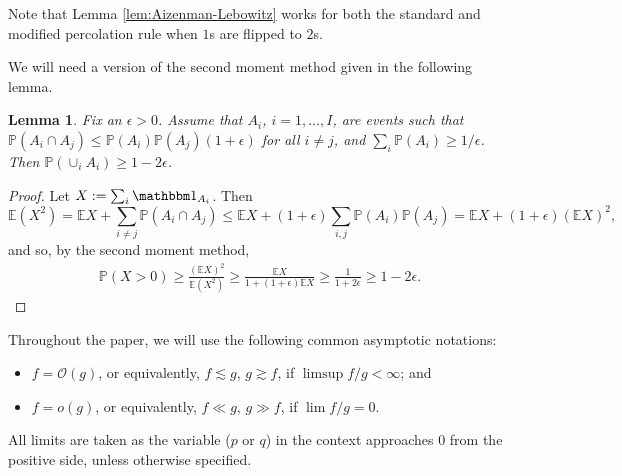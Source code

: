 \documentclass{article}
\renewcommand{\P}{\mathbb{P}}
\newcommand{\E}[0]{\mathbb{E}}
\newcommand{\cO}{\mathcal O}
\numberwithin{equation}{section}
\newtheorem{lemma}[theorem]{Lemma}
\newtheorem{remark}[theorem]{Remark}
\begin{document}

Note that Lemma \ref{lem:Aizenman-Lebowitz} works for both the standard and modified percolation rule when $1$s are flipped to $2$s.

We will need a version of the second moment method given in the following lemma.

\begin{lemma}\label{lem:2nd-moment} Fix an $\epsilon>0$.
Assume that $A_i$, $i=1,\ldots, I$, are events such that $\P(A_i\cap A_j)\le \P(A_i)\P(A_j)(1+\epsilon)$ for all $i\ne j$, and $\sum_i\P(A_i)\ge 1/\epsilon$. Then 
$\P(\cup_iA_i)\ge 1-2\epsilon$. 
\end{lemma}

\begin{proof} Let  
$X := \sum_i \mathbbm 1_{A_i}$.  Then 
$$
\E(X^2)=\E X+\sum_{i\ne j} \P(A_i\cap A_j)\le \E X+(1+\epsilon)\sum_{i,j} \P(A_i)\P(A_j)=\E X+(1+\epsilon)(\E X)^2, 
$$
and so, by the second moment method, 
\begin{equation*}
\begin{aligned}
\P(X>0)\ge \frac{(\E X)^2}{\E(X^2)} 
\ge \frac{\E X}{1+(1+\epsilon)\E X}
\ge 
\frac{1}{1+2\epsilon}
\ge 
1-2\epsilon.
\end{aligned}
\end{equation*}
\end{proof}


Throughout the paper, we will use the following common asymptotic notations:

\begin{itemize}
    \item 
    $f = \cO(g)$, or equivalently, $f \lesssim g$, $g \gtrsim f$, if $\limsup f/g < \infty$; and
    \item 
    $f = o(g)$, or equivalently, $f \ll g$, $g \gg f$, if $\lim f/g = 0$.
\end{itemize}
All limits are taken as the variable ($p$ or $q$) in the context approaches $0$ from the positive side, unless otherwise specified.
\end{document}
